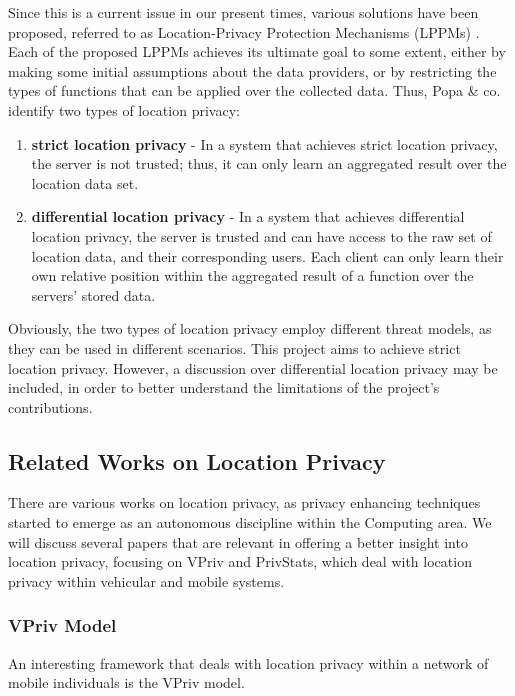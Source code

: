 Since this is a current issue in our present times, various solutions have been proposed, referred to as Location-Privacy Protection Mechanisms (LPPMs) \cite{quantifylocationprivacy}. Each of the proposed LPPMs achieves its ultimate goal to some extent, either by making some initial assumptions about the data providers, or by restricting the types of functions that can be applied over the collected data. Thus, Popa \& co. \cite{privstats} identify two types of location privacy:

\begin{enumerate}
\item \textbf{strict location privacy} - In a system that achieves strict location privacy, the server is not trusted; thus, it can only learn an aggregated result over the location data set.
\item \textbf{differential location privacy} - In a system that achieves differential location privacy, the server is trusted and can have access to the raw set of location data, and their corresponding users. Each client can only learn their own relative position within the aggregated result of a function over the servers' stored data.
\end{enumerate}

Obviously, the two types of location privacy employ different threat models, as they can be used in different scenarios. This project aims to achieve strict location privacy. However, a discussion over differential location privacy may be included, in order to better understand the limitations of the project's contributions.

\subsection{Related Works on Location Privacy}
There are various works on location privacy, as privacy enhancing techniques started to emerge as an autonomous discipline within the Computing area. We will discuss several papers that are relevant in offering a better insight into location privacy, focusing on VPriv \cite{popathesis} and PrivStats\cite{privstats}, which deal with location privacy within vehicular and mobile systems.

\subsubsection{VPriv Model}
An interesting framework that deals with location privacy within a network of mobile individuals is the VPriv model. \cite{popathesis}

